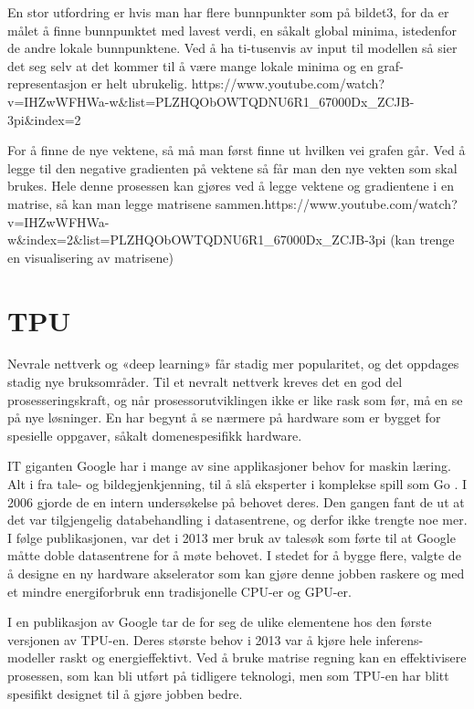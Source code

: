En stor utfordring er hvis man har flere bunnpunkter som på bildet3, for da er målet å finne bunnpunktet med lavest verdi, en såkalt global minima, istedenfor de andre lokale bunnpunktene. Ved å ha ti-tusenvis av input til modellen så sier det seg selv at det kommer til å være mange lokale minima og en graf-representasjon er helt ubrukelig. https://www.youtube.com/watch?v=IHZwWFHWa-w&list=PLZHQObOWTQDNU6R1_67000Dx_ZCJB-3pi&index=2
 
For å finne de nye vektene, så må man først finne ut hvilken vei grafen går. Ved å legge til den negative gradienten på vektene så får man den nye vekten som skal brukes. Hele denne prosessen kan gjøres ved å legge vektene og gradientene i en matrise, så kan man legge matrisene sammen.https://www.youtube.com/watch?v=IHZwWFHWa-w&index=2&list=PLZHQObOWTQDNU6R1_67000Dx_ZCJB-3pi   (kan trenge en visualisering av matrisene)


\section{TPU}
Nevrale nettverk og «deep learning» får stadig mer popularitet, og det oppdages stadig nye bruksområder. Til et nevralt nettverk kreves det en god del prosesseringskraft, og når prosessorutviklingen ikke er like rask som før, må en se på nye løsninger. En har begynt å se nærmere på hardware som er bygget for spesielle oppgaver, såkalt domenespesifikk hardware. 

IT giganten Google har i mange av sine applikasjoner behov for maskin læring. Alt i fra tale- og bildegjenkjenning, til å slå eksperter i komplekse spill som Go \cite{look_at_TPU}. I 2006 gjorde de en intern undersøkelse på behovet deres. Den gangen fant de ut at det var tilgjengelig databehandling i datasentrene, og derfor ikke trengte noe mer. I følge publikasjonen, var det i 2013 mer bruk av talesøk som førte til at Google måtte doble datasentrene for å møte behovet. I stedet for å bygge flere, valgte de å designe en ny hardware akselerator som kan gjøre denne jobben raskere og med et mindre energiforbruk enn tradisjonelle CPU-er og GPU-er.

I en publikasjon av Google \cite{tpu_main} tar de for seg de ulike elementene hos den første versjonen av TPU-en. Deres største behov i 2013 var å kjøre hele inferens-modeller raskt og energieffektivt. Ved å bruke matrise regning kan en effektivisere prosessen, som kan bli utført på tidligere teknologi, men som TPU-en har blitt spesifikt designet til å gjøre jobben bedre.

